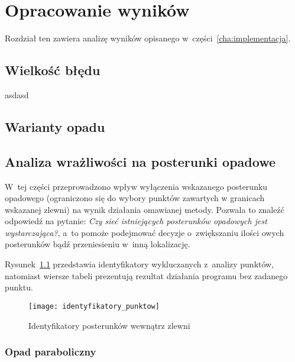 \chapter{Opracowanie wyników}

Rozdział ten zawiera analizę wyników opisanego w~części~\ref{cha:implementacja}.


\section{Wielkość błędu}
asdasd

\section{Warianty opadu}

\section{Analiza wrażliwości na posterunki opadowe}
W~tej części przeprowadzono wpływ wyłączenia wskazanego posterunku opadowego (ograniczono się do wybory punktów zawartych w granicach wskazanej zlewni) na wynik działania omawianej metody. Pozwala to znaleźć odpowiedź na pytanie: \textit{Czy sieć istniejących posterunków opadowych jest wystarczająca?}, a~to pomoże podejmować decyzje o~zwiększaniu ilości owych posterunków bądź przeniesieniu w~inną lokalizację.

Rysunek~\ref{fig:identyfikatory} przedstawia identyfikatory wykluczanych z~analizy punktów, natomiast wiersze tabeli prezentują rezultat działania programu bez zadanego punktu.

\begin{figure}[!ht]
	\centering
	\texttt{[image: identyfikatory\_punktow]}
	\label{fig:identyfikatory}
	\caption{Identyfikatory posterunków wewnątrz zlewni}
\end{figure}

\subsection{Opad paraboliczny}

